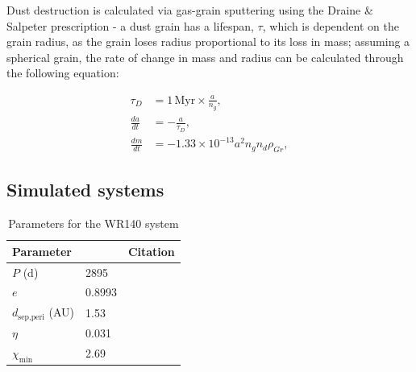 Dust destruction is calculated via gas-grain sputtering using the Draine \& Salpeter prescription - a dust grain has a lifespan, $\tau$, which is dependent on the grain radius, as the grain loses radius proportional to its loss in mass; assuming a spherical grain, the rate of change in mass and radius can be calculated through the following equation:

\begin{subequations}
  \begin{align}
           \tau_D & = 1 \, \text{Myr} \times \frac{a}{n_g} , \\
    \frac{da}{dt} & = - \frac{a}{\tau_D} , \\
    \frac{dm}{dt} & = -1.33 \times 10^{-13} a^2 n_g n_d \rho_{Gr} ,
  \end{align}
\end{subequations}

\subsection{Simulated systems}






\begin{table}[]
  \centering
  \begin{tabular}{llll}
  \hline
  \multicolumn{1}{l}{Parameter} &  &  & Citation \\ \hline
  $P$ (d) & \multicolumn{2}{l}{2895} & \textcite{thomasOrbitStellarMasses2021} \\
  $e$ & \multicolumn{2}{l}{0.8993} & \textcite{thomasOrbitStellarMasses2021} \\
  $d_{\text{sep,peri}}$ (AU) & \multicolumn{2}{l}{1.53} & \textcite{thomasOrbitStellarMasses2021} \\
  $\eta$ & \multicolumn{2}{l}{\num{0.031}} &  \\ 
  $\chi_\text{min}$ & \multicolumn{2}{l}{\num{2.69}} &  \\ \hline 
  \end{tabular}
  \caption{Parameters for the WR140 system}
  \label{tab:wr140-params}
\end{table}  


